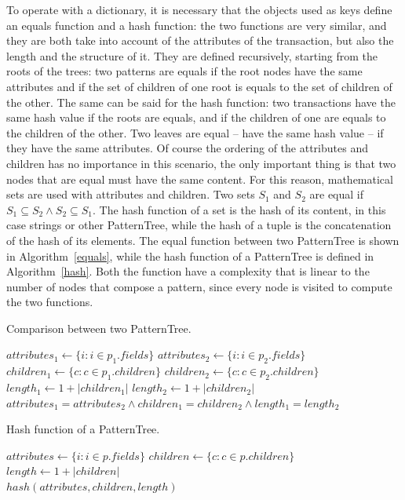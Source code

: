 \documentclass{acm_proc_article-sp-sigmod09}
\begin{document}
To operate with a dictionary, it is necessary that the objects used as keys define an equals function and a hash function: the two functions are very similar, and they are both take into account of the attributes of the transaction, but also the length and the structure of it. They are defined recursively, starting from the roots of the trees: two patterns are equals if the root nodes have the same attributes and if the set of children of one root is equals to the set of children of the other. The same can be said for the hash function: two transactions have the same hash value if the roots are equals, and if the children of one are equals to the children of the other. Two leaves are equal -- have the same hash value -- if they have the same attributes. Of course the ordering of the attributes and children has no importance in this scenario, the only important thing is that two nodes that are equal must have the same content. For this reason, mathematical sets are used with attributes and children. Two sets $S_1$ and $S_2$ are equal if $S_1 \subseteq S_2 \land S_2 \subseteq S_1$. The hash function of a set is the hash of its content, in this case strings or other PatternTree, while the hash of a tuple is the concatenation of the hash of its elements. The equal function between two PatternTree is shown in Algorithm~\ref{equals}, while the hash function of a PatternTree is defined in Algorithm~\ref{hash}. Both the function have a complexity that is linear to the number of nodes that compose a pattern, since every node is visited to compute the two functions.

\begin{algorithm}
\caption{Comparison between two PatternTree.}
\label{equals}
\begin{algorithmic}[1]
\State $attributes_1 \gets \{i : i \in p_1.fields\}$
\State $attributes_2 \gets \{i : i \in p_2.fields\}$
\State $children_1 \gets \{c : c \in p_1.children\}$
\State $children_2 \gets \{c : c \in p_2.children\}$
\State $length_1 \gets 1 + |children_1|$
\State $length_2 \gets 1 + |children_2|$ \\
\Return $attributes_1 = attributes_2 \land children_1 = children_2 \land length_1 = length_2$
\EndFunction
\end{algorithmic}
\end{algorithm}

\begin{algorithm}
\caption{Hash function of a PatternTree.}
\label{hash}
\begin{algorithmic}[1]
\State $attributes \gets \{i : i \in p.fields\}$
\State $children \gets \{c : c \in p.children\}$
\State $length \gets 1 + |children|$ \\
\Return $hash(attributes, children, length)$
\EndFunction
\end{algorithmic}
\end{algorithm}
\end{document}
